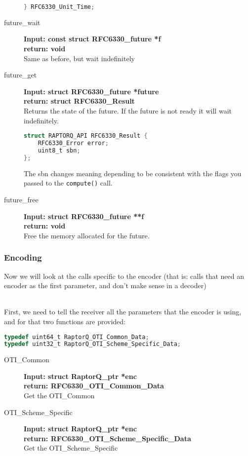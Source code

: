 \documentclass[11pt,a4paper]{refart}
\begin{document}
\begin{description}
\begin{lstlisting}[language=C]
} RFC6330_Unit_Time;
\end{lstlisting}
\item[future\_wait] \textbf{Input: const struct RFC6330\_future *f}\\
\textbf{return: void}\\
Same as before, but wait indefinitely
\item[future\_get] \textbf{Input: struct RFC6330\_future *future}\\
\textbf{return: struct RFC6330\_Result}\\
Returns the state of the future. If the future is not ready it will wait indefinitely.
\begin{lstlisting}[language=C]
struct RAPTORQ_API RFC6330_Result {
    RFC6330_Error error;
    uint8_t sbn;
};
\end{lstlisting}
The sbn changes meaning depending to be consistent with the flags you passed to the \texttt{compute()} call.
\item[future\_free] \textbf{Input: struct RFC6330\_future **f}\\
\textbf{return: void}\\
Free the memory allocated for the future.
\end{description}

\newpage
\subsubsection{\textbf{Encoding}}
Now we will look at the calls specific to the encoder (that is: calls that need an encoder as the first parameter, and don't make sense in a decoder)

\\
First, we need to tell the receiver all the parameters that the encoder is using, and for that two functions are provided:
\begin{lstlisting}[language=C]
typedef uint64_t RaptorQ_OTI_Common_Data;
typedef uint32_t RaptorQ_OTI_Scheme_Specific_Data;
\end{lstlisting}
\begin{description}
\item[OTI\_Common]\textbf{Input: struct RaptorQ\_ptr *enc}\\
\textbf{return: RFC6330\_OTI\_Common\_Data}\\
Get the OTI\_Common
\item[OTI\_Scheme\_Specific]\textbf{Input: struct RaptorQ\_ptr *enc}\\
\textbf{return: RFC6330\_OTI\_Scheme\_Specific\_Data}\\
Get the OTI\_Scheme\_Specific
\end{description}
\end{document}
